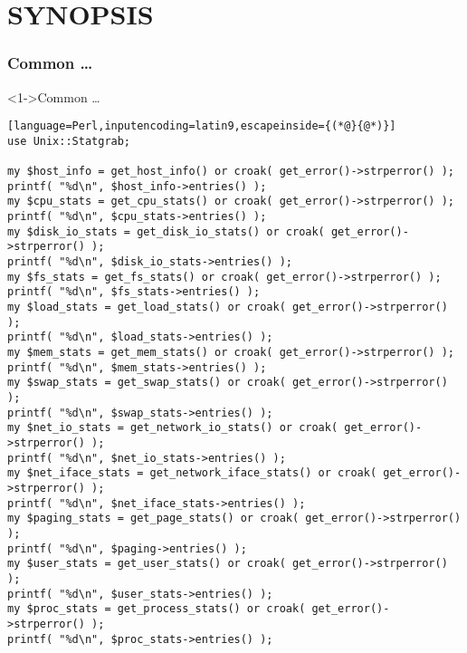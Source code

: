 \documentclass[ngerman,xcolor={table,dvipsnames},smaller,compress,hyperref={bookmarks,colorlinks}]{beamer}
\begin{document}
\section{SYNOPSIS}

\begin{frame}[fragile]
\frametitle{Common \ldots}
\begin{block}<1->{Common \ldots}
\tiny
\begin{lstlisting}[language=Perl,inputencoding=latin9,escapeinside={(*@}{@*)}]
use Unix::Statgrab;

my $host_info = get_host_info() or croak( get_error()->strperror() );
printf( "%d\n", $host_info->entries() );
my $cpu_stats = get_cpu_stats() or croak( get_error()->strperror() );
printf( "%d\n", $cpu_stats->entries() );
my $disk_io_stats = get_disk_io_stats() or croak( get_error()->strperror() );
printf( "%d\n", $disk_io_stats->entries() );
my $fs_stats = get_fs_stats() or croak( get_error()->strperror() );
printf( "%d\n", $fs_stats->entries() );
my $load_stats = get_load_stats() or croak( get_error()->strperror() );
printf( "%d\n", $load_stats->entries() );
my $mem_stats = get_mem_stats() or croak( get_error()->strperror() );
printf( "%d\n", $mem_stats->entries() );
my $swap_stats = get_swap_stats() or croak( get_error()->strperror() );
printf( "%d\n", $swap_stats->entries() );
my $net_io_stats = get_network_io_stats() or croak( get_error()->strperror() );
printf( "%d\n", $net_io_stats->entries() );
my $net_iface_stats = get_network_iface_stats() or croak( get_error()->strperror() );
printf( "%d\n", $net_iface_stats->entries() );
my $paging_stats = get_page_stats() or croak( get_error()->strperror() );
printf( "%d\n", $paging->entries() );
my $user_stats = get_user_stats() or croak( get_error()->strperror() );
printf( "%d\n", $user_stats->entries() );
my $proc_stats = get_process_stats() or croak( get_error()->strperror() );
printf( "%d\n", $proc_stats->entries() );
\end{lstlisting}
\end{block}
\end{frame}
\end{document}
